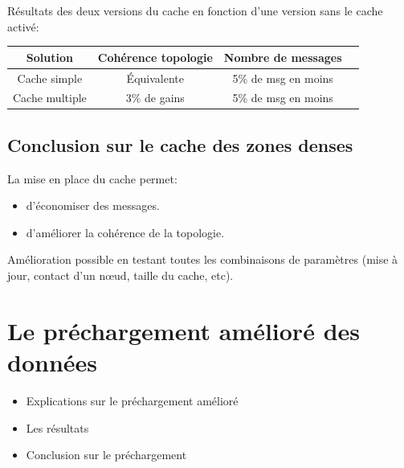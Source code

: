 \documentclass{beamer}
\begin{document}
\begin{frame}
\begin{columns}
\begin{column}{5cm}
         \end{column}
        \end{columns}


  \end{frame}

  \begin{frame}
  	Résultats des deux versions du cache en fonction d'une version sans le cache activé:
	\begin{table}[!h]
  		\begin{center}
    		\begin{tabular}{|c|c|c|c|}
      		\hline
      		Solution & Cohérence topologie & Nombre de messages \\
      		\hline
      		Cache simple & Équivalente &  5\% de msg en moins\\
      		Cache multiple & 3\% de gains &  5\% de msg en moins\\
      		\hline
    		\end{tabular}
  		\end{center}
  		\label{tab:config1}
	\end{table}
	
  \end{frame}
	
  \subsection{Conclusion sur le cache des zones denses}
  \begin{frame}
  	La mise en place du cache permet:\\
	\begin{itemize}
		\item d'économiser des messages.\\
		\item d'améliorer la cohérence de la topologie.\\
	\end{itemize}
	\vspace{5mm}
	Amélioration possible en testant toutes les combinaisons de paramètres (mise à jour, contact d'un nœud, taille du cache, etc).\\
  \end{frame}



  \section{Le préchargement amélioré des données}
  \begin{frame}
	\begin{itemize}
		\item Explications sur le préchargement amélioré
		\item Les résultats 
		\item Conclusion sur le préchargement
	\end{itemize}
  \end{frame}
\end{document}
